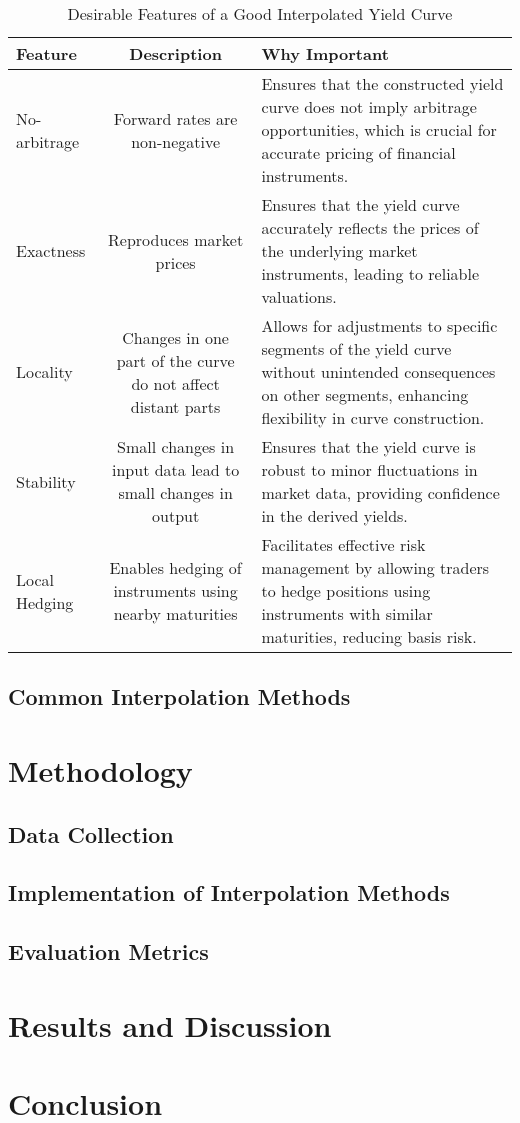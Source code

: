 \documentclass{article}
\begin{document}
\begin{table}[h]
\centering
\caption{Desirable Features of a Good Interpolated Yield Curve}
\begin{tabularx}{\textwidth}{l c X}
\toprule
Feature & Description & Why Important \\
\midrule
No-arbitrage & Forward rates are non-negative & Ensures that the constructed yield curve does not imply arbitrage opportunities, which is crucial for accurate pricing of financial instruments. \\
Exactness & Reproduces market prices & Ensures that the yield curve accurately reflects the prices of the underlying market instruments, leading to reliable valuations. \\
Locality & Changes in one part of the curve do not affect distant parts & Allows for adjustments to specific segments of the yield curve without unintended consequences on other segments, enhancing flexibility in curve construction. \\
Stability & Small changes in input data lead to small changes in output & Ensures that the yield curve is robust to minor fluctuations in market data, providing confidence in the derived yields. \\
Local Hedging & Enables hedging of instruments using nearby maturities & Facilitates effective risk management by allowing traders to hedge positions using instruments with similar maturities, reducing basis risk. \\
\bottomrule
\end{tabularx}
\end{table}


\subsection{Common Interpolation Methods}


\section{Methodology}

\subsection{Data Collection}

\subsection{Implementation of Interpolation Methods}


\subsection{Evaluation Metrics}

\section{Results and Discussion}

\section{Conclusion}
\end{document}
